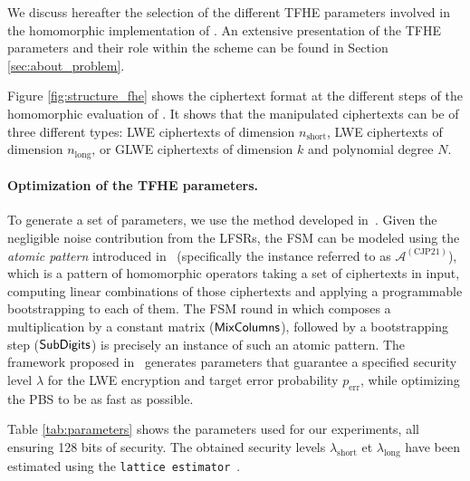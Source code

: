 We discuss hereafter the selection of the different TFHE parameters involved in the homomorphic implementation of \coolName. An extensive presentation of the TFHE parameters and their role within the scheme can be found in Section \ref{sec:about_problem}.

Figure \ref{fig:structure_fhe} shows the ciphertext format at the different steps of the homomorphic evaluation of \coolName. It shows that the manipulated ciphertexts can be of three different types: LWE ciphertexts of dimension $n_{\text{short}}$, LWE ciphertexts of dimension $n_{\text{long}}$, or GLWE ciphertexts of dimension $k$ and polynomial degree $N$.
	




\paragraph{Optimization of the TFHE parameters.}
To generate a set of parameters, we use the method developed in~\cite{JC:BBBCLO23}. Given the negligible noise contribution from the LFSRs, the FSM can be modeled using the \emph{atomic pattern} introduced in~\cite{JC:BBBCLO23} (specifically the instance referred to as $\mathcal{A}^{(\text{CJP21})}$), which is a pattern of homomorphic operators taking a set of ciphertexts in input, computing linear combinations of those ciphertexts and applying a programmable bootstrapping to each of them. The FSM round in \coolName which composes a multiplication by a constant matrix ($\text{\textsf{MixColumns}}$), followed by a bootstrapping step ($\text{\textsf{SubDigits}}$) is precisely an instance of such an atomic pattern. The framework proposed in~\cite{JC:BBBCLO23} generates parameters that guarantee a specified security level $\lambda$ for the LWE encryption and target error probability $p_{\text{err}}$, while optimizing the PBS to be as fast as possible. 

Table \ref{tab:parameters} shows the parameters used for our experiments, all ensuring 128 bits of security. The obtained security levels $\lambda_{\text{short}}$ et $\lambda_{\text{long}}$ have been estimated using the \texttt{lattice estimator}~\cite{lattice-estimator}.


